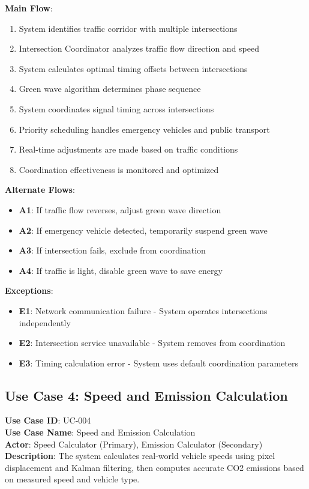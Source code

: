 \documentclass[12pt,a4paper]{article}
\begin{document}
\textbf{Main Flow}:
\begin{enumerate}
    \item System identifies traffic corridor with multiple intersections
    \item Intersection Coordinator analyzes traffic flow direction and speed
    \item System calculates optimal timing offsets between intersections
    \item Green wave algorithm determines phase sequence
    \item System coordinates signal timing across intersections
    \item Priority scheduling handles emergency vehicles and public transport
    \item Real-time adjustments are made based on traffic conditions
    \item Coordination effectiveness is monitored and optimized
\end{enumerate}

\textbf{Alternate Flows}:
\begin{itemize}
    \item \textbf{A1}: If traffic flow reverses, adjust green wave direction
    \item \textbf{A2}: If emergency vehicle detected, temporarily suspend green wave
    \item \textbf{A3}: If intersection fails, exclude from coordination
    \item \textbf{A4}: If traffic is light, disable green wave to save energy
\end{itemize}

\textbf{Exceptions}:
\begin{itemize}
    \item \textbf{E1}: Network communication failure - System operates intersections independently
    \item \textbf{E2}: Intersection service unavailable - System removes from coordination
    \item \textbf{E3}: Timing calculation error - System uses default coordination parameters
\end{itemize}

\subsection{Use Case 4: Speed and Emission Calculation}

\textbf{Use Case ID}: UC-004 \\
\textbf{Use Case Name}: Speed and Emission Calculation \\
\textbf{Actor}: Speed Calculator (Primary), Emission Calculator (Secondary) \\
\textbf{Description}: The system calculates real-world vehicle speeds using pixel displacement and Kalman filtering, then computes accurate CO2 emissions based on measured speed and vehicle type.
\end{document}
